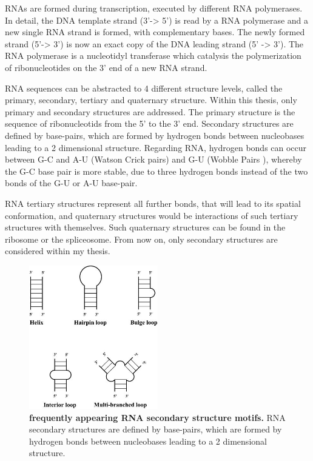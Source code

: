 \documentclass[ twoside,openright,titlepage,numbers=noenddot,headinclude,%
                footinclude=false, cleardoublepage=empty,abstractoff, %
                BCOR=5mm,paper=a4,fontsize=11pt,%
                ngerman,american,%
                ]{scrreprt}
\begin{document}
RNAs are formed during transcription, executed by different RNA polymerases. In detail, the DNA template strand (3'-> 5') is read by a RNA polymerase and a new single RNA strand is formed, with complementary bases. The newly formed strand (5'-> 3') is now an exact copy of the DNA leading strand (5' -> 3'). The RNA polymerase is a nucleotidyl transferase which catalysis the polymerization of ribonucleotides on the 3' end of a new RNA strand.


RNA sequences can be abstracted to 4 different structure levels, called the
primary, secondary, tertiary and quaternary structure. Within this thesis,
only primary and secondary structures are addressed. The primary structure
is the sequence of ribonucleotids from the 5' to the 3' end. Secondary
structures are defined by base-pairs, which are formed by hydrogen bonds between nucleobases 
leading to a 2 dimensional structure. Regarding RNA, hydrogen bonds can
occur between G-C and  A-U (Watson Crick pairs) and G-U (Wobble Pairs ), whereby the G-C base pair is more stable, due to three hydrogen bonds instead of the two bonds of the G-U or A-U base-pair.

RNA tertiary structures represent all further bonds, that will lead to its spatial conformation, and quaternary structures would be interactions of such tertiary structures with themselves. Such quaternary structures can be found in the ribosome or the spliceosome\citep{spliceosome}.
From now on, only secondary structures are considered within my thesis.

\begin{figure}
  \begin{center}
\includegraphics[width=0.5\textwidth]{./pictures/secondary_structure_motifs.jpg}
  \end{center}
\caption{{\bf frequently appearing RNA secondary structure motifs\citep{SecondaryStructureMotifs}.}  
RNA secondary structures are defined by base-pairs, which are formed by hydrogen bonds between nucleobases 
leading to a 2 dimensional structure.}
\label{fig:secondaryStructureMotifs}
\end{figure}
\end{document}
